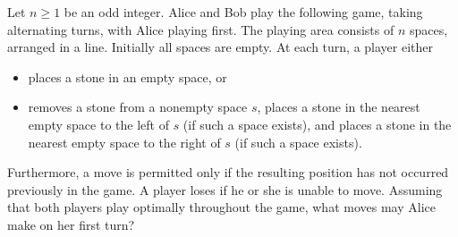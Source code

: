 Let $n \geq 1$ be an odd integer. Alice and Bob play the following game,
taking alternating turns, with Alice playing first. 
The playing area consists of $n$ spaces, arranged in a line.
Initially all spaces are empty.
At each turn, a player either
\begin{itemize}
\item
places a stone in an empty space, or
\item
removes a stone from a nonempty space $s$, 
places a stone in the nearest empty space to the left of $s$
(if such a space exists),
and places a stone in the nearest empty space to the right of $s$
(if such a space exists).
\end{itemize}
Furthermore, a move is permitted only if the resulting position has not occurred previously in the game. A player loses if he or she is unable to move. Assuming that both players play optimally throughout the game, what moves may Alice make on her first turn?
